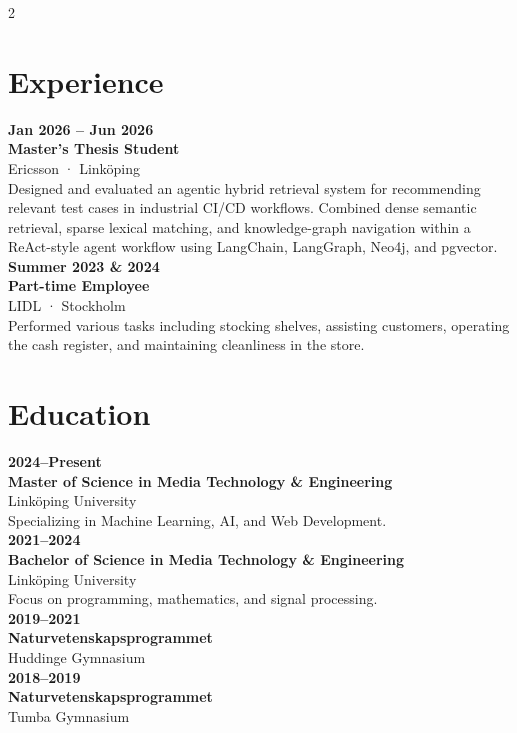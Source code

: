 \documentclass{modernsimplecv}
\begin{document}
\begin{paracol}{2}
\section*{Experience}

\noindent\textbf{Jan 2026 -- Jun 2026} \\
\textbf{Master's Thesis Student} \\
Ericsson · Linköping \\
Designed and evaluated an agentic hybrid retrieval system for recommending relevant test cases in industrial CI/CD workflows. Combined dense semantic retrieval, sparse lexical matching, and knowledge-graph navigation within a ReAct-style agent workflow using LangChain, LangGraph, Neo4j, and pgvector. \\[1em]

\noindent\textbf{Summer 2023 \& 2024} \\
\textbf{Part-time Employee} \\
LIDL · Stockholm \\
Performed various tasks including stocking shelves, assisting customers, operating the cash register, and maintaining cleanliness in the store. \\[1em]

\section*{Education}

\noindent\textbf{2024--Present} \\
\textbf{Master of Science in Media Technology \& Engineering} \\
Linköping University \\
Specializing in Machine Learning, AI, and Web Development. \\[1em]

\noindent\textbf{2021--2024} \\
\textbf{Bachelor of Science in Media Technology \& Engineering} \\
Linköping University \\
Focus on programming, mathematics, and signal processing. \\[1em]

\noindent\textbf{2019--2021} \\
\textbf{Naturvetenskapsprogrammet} \\
Huddinge Gymnasium \\

\noindent\textbf{2018--2019} \\
\textbf{Naturvetenskapsprogrammet} \\
Tumba Gymnasium \\


\end{paracol}
\end{document}
